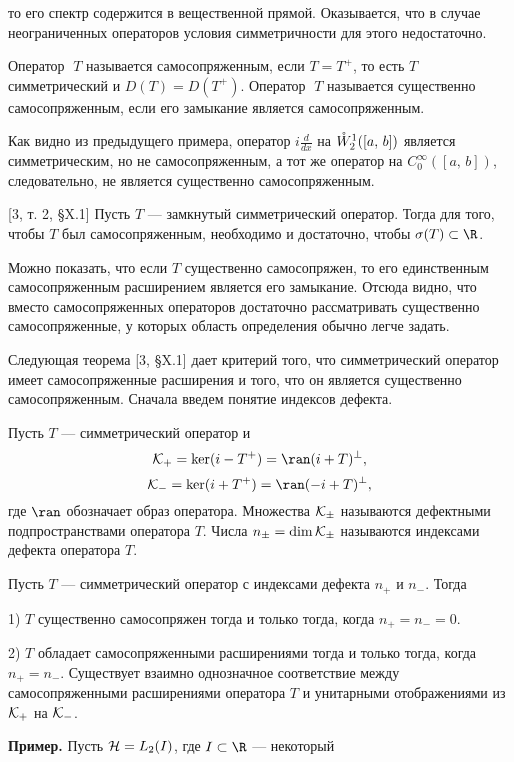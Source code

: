 \documentclass[a4paper
]{article}
\begin{document}
то его спектр содержится в вещественной прямой. Оказывается, что в
случае неограниченных операторов условия симметричности для этого
недостаточно.
\begin{Def}
Оператор $\; T$ называется самосопряженным, если $T=T^+$, то есть
$T$ симметрический и $D(T)=D(T^+)$. Оператор $\; T$ называется
существенно самосопряженным, если его замыкание является
самосопряженным.
\end{Def}
Как видно из предыдущего примера, оператор $i\frac{d}{dx}$ на $\mathaccent'27
W^1_2([a, \, b])$ является симметрическим, но не самосопряженным, а
тот же оператор на $C_0^\infty([a, \, b])$, следовательно, не является
существенно самосопряженным. \par
\begin{Trm} {\rm [3, т. 2, \S X.1]}
Пусть $T$ --- замкнутый симметрический оператор. Тогда для того, чтобы
$T$ был самосопряженным, необходимо и достаточно, чтобы $\sigma(T)
\subset \R$.
\end{Trm}
Можно показать, что если $T$ существенно самосопряжен, то его единственным
самосопряженным расширением является его замыкание. Отсюда видно, что вместо
самосопряженных операторов достаточно рассматривать существенно
самосопряженные, у которых область определения обычно легче задать. \par
Следующая теорема [3, \S X.1] дает критерий того, что
симметрический оператор имеет самосопряженные расширения и того, что
он является существенно самосопряженным. Сначала введем понятие
индексов дефекта.
\begin{Def}
Пусть $T$ --- симметрический оператор и
$${\cal K_+}=\ker(i-T^+)=\ran(i+T)^{\bot},$$
$${\cal K_-}=\ker(i+T^+)=\ran(-i+T)^{\bot},$$
где $\ran$ обозначает образ оператора. Множества ${\cal K_{\pm}}$
называются дефектными подпространствами оператора $T$. Числа $n_{\pm}=
\dim {\cal K_{\pm}}$ называются индексами дефекта оператора $T$.
\end{Def}
\begin{Trm}
\label{krit_samosopr}
Пусть $T$ --- симметрический оператор с индексами дефекта $n_+$ и
$n_-$. Тогда \par
1) $T$ существенно самосопряжен тогда и только тогда, когда
$n_+=n_-=0$. \par
2) $T$ обладает самосопряженными расширениями тогда и только тогда,
когда $n_+=n_-$. Существует взаимно однозначное соответствие между
самосопряженными расширениями оператора $T$ и унитарными отображениями
из ${\cal K_+}$ на ${\cal K_-}$.
\end{Trm}
{\bf Пример.} Пусть ${\cal H}=L_2(I)$, где $I\subset \R$ --- некоторый
\end{document}
